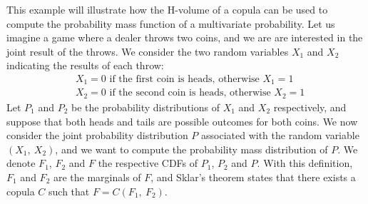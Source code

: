 \begin{example}\label{ex:hvolume}
    This example will illustrate how the H-volume of a copula can be used to compute the probability mass function of a multivariate probability. Let us imagine a game where a dealer throws two coins, and we are are interested in the joint result of the throws. We consider the two random variables $X_1$ and $X_2$ indicating the results of each throw:
    \begin{align*}
        &X_1=0\text{ if the first coin is heads, otherwise }X_1=1\\
        &X_2=0\text{ if the second coin is heads, otherwise }X_2=1
    \end{align*}
    Let $P_1$ and $P_2$ be the probability distributions of $X_1$ and $X_2$ respectively, and suppose that both heads and tails are possible outcomes for both coins. We now consider the joint probability distribution $P$ associated with the random variable $(X_1,~X_2)$, and we want to compute the probability mass distribution of $P$. We denote $F_1$, $F_2$ and $F$ the respective CDFs of $P_1$, $P_2$ and $P$. With this definition, $F_1$ and $F_2$ are the marginals of $F$, and Sklar's theorem states that there exists a copula $C$ such that $F=C(F_1,~F_2)$. 
    

\end{example}

